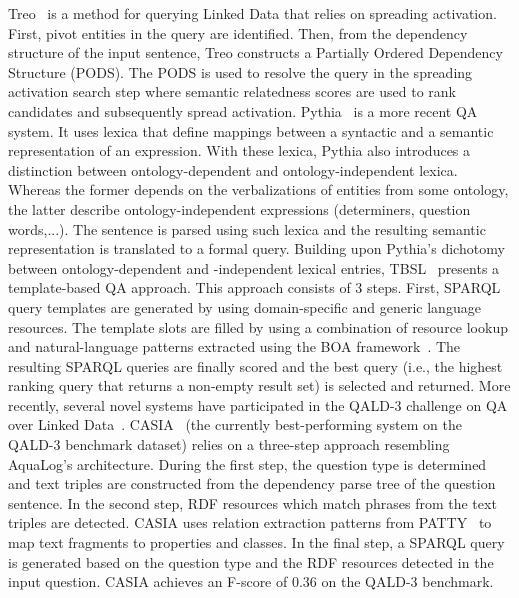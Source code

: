 \documentclass{acm_proc_article-sp}
\begin{document}
Treo~\cite{treo} is a method for querying Linked Data that relies on spreading activation.
First, pivot entities in the query are identified.
Then, from the dependency structure of the input sentence, Treo constructs a Partially Ordered Dependency Structure (PODS).
The PODS is used to resolve the query in the spreading activation search step where semantic relatedness scores are used to rank candidates and subsequently spread activation.
Pythia~\cite{pythia} is a more recent QA system.
It uses lexica that define mappings between a syntactic and a semantic representation of an expression.
With these lexica, Pythia also introduces a distinction between ontology-dependent and ontology-independent lexica. 
Whereas the former depends on the verbalizations of entities from some ontology, the latter describe ontology-independent expressions (determiners, question words,...).
The sentence is parsed using such lexica and the resulting semantic representation is translated to a formal query.
Building upon Pythia's dichotomy between ontology-dependent and -independent lexical entries, TBSL~\cite{tbsl} presents a tem\-plate-based QA approach. 
This approach consists of 3 steps. First, SPARQL query templates are generated by using do\-main-specific and generic language resources.
The template slots are filled by using a combination of resource lookup and natural-language patterns extracted using the BOA framework~\cite{BOA}. The resulting SPARQL queries are finally scored and the best query (i.e., the highest ranking query that returns a non-empty result set) is selected and returned. 
More recently, several novel systems have participated in the QALD-3 challenge on QA over Linked Data~\cite{qald3}.  
CASIA~\cite{casia} (the currently best-performing system on the QALD-3 benchmark dataset) relies on a three-step approach resembling AquaLog's architecture.
During the first step, the question type is determined and text triples are constructed from the dependency parse tree of the question sentence. 
In the second step, RDF resources which match phrases from the text triples are detected. 
CASIA uses relation extraction patterns from PATTY~\cite{patty} to map text fragments to properties and classes.
In the final step, a SPARQL query is generated based on the question type and the RDF resources detected in the input question.
CASIA achieves an F-score of $0.36$ on the QALD-3 benchmark.
\end{document}
